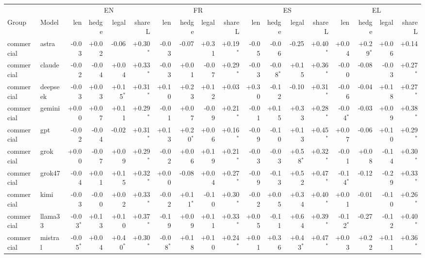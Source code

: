 \begin{tabular}{llrrrrrrrrrrrrrrrr}
\hline
 & & \multicolumn{4}{c}{EN} & \multicolumn{4}{c}{FR} & \multicolumn{4}{c}{ES} & \multicolumn{4}{c}{EL}\\
Group & Model & len & hedge & legal & share L & len & hedge & legal & share L & len & hedge & legal & share L & len & hedge & legal & share L\\
\hline
commercial & astra & -0.03 & +0.02 & -0.06 & +0.30$^*$ & -0.03 & -0.07 & +0.31 & +0.19$^*$ & -0.05 & -0.06 & -0.25 & +0.40$^*$ & +0.04 & +0.29$^*$ & +0.06 & +0.14\\
commercial & claude & -0.02 & -0.04 & +0.04 & +0.33$^*$ & -0.03 & +0.01 & -0.07 & +0.29$^*$ & -0.03 & -0.08$^*$ & +0.15 & +0.36$^*$ & -0.00 & -0.08 & -0.03 & +0.27$^*$\\
commercial & deepseek & -0.03 & +0.03 & +0.15$^*$ & +0.31$^*$ & +0.10 & +0.23 & +0.12 & +0.03 & +0.30 & -0.12 & -0.10 & +0.31$^*$ & -0.06 & -0.04 & +0.18 & +0.27$^*$\\
commercial & gemini & +0.00 & +0.07 & +0.11 & +0.29$^*$ & -0.01 & +0.07 & -0.09 & +0.21$^*$ & -0.01 & +0.15 & +0.33 & +0.28$^*$ & -0.04$^*$ & -0.03 & +0.09 & +0.38$^*$\\
commercial & gpt & -0.02 & -0.04 & -0.02 & +0.31$^*$ & +0.13 & +0.20$^*$ & +0.06 & +0.16$^*$ & -0.09 & -0.10 & +0.13 & +0.45$^*$ & +0.07 & -0.06 & +0.10 & +0.29$^*$\\
commercial & grok & +0.00 & -0.07 & +0.09 & +0.29$^*$ & -0.02 & +0.06 & +0.19 & +0.21$^*$ & -0.03 & -0.03 & +0.58$^*$ & +0.32$^*$ & -0.01 & +0.08 & -0.14 & +0.30$^*$\\
commercial & grok47 & -0.04 & +0.01 & +0.15 & +0.32$^*$ & +0.00 & -0.08 & +0.04 & +0.27$^*$ & -0.09 & -0.13 & +0.52 & +0.47$^*$ & -0.14$^*$ & -0.12 & -0.29 & +0.33$^*$\\
commercial & kimi & -0.03 & -0.00 & +0.02 & +0.33$^*$ & -0.02 & +0.11$^*$ & -0.10 & +0.30$^*$ & -0.02 & +0.05 & +0.34 & +0.40$^*$ & +0.01 & -0.01 & -0.10 & +0.26$^*$\\
commercial & llama33 & -0.03$^*$ & +0.13 & +0.10 & +0.37$^*$ & -0.19 & +0.09 & +0.11 & +0.33$^*$ & +0.05 & -0.11 & +0.64 & +0.39$^*$ & -0.12$^*$ & -0.27 & -0.12 & +0.40$^*$\\
commercial & mistral & -0.05$^*$ & +0.04 & +0.40$^*$ & +0.30$^*$ & -0.08$^*$ & +0.18 & +0.10 & +0.24$^*$ & +0.01 & +0.36 & +0.43$^*$ & +0.47$^*$ & +0.03 & +0.22 & +0.11 & +0.36$^*$\\
\hline
\end{tabular}
